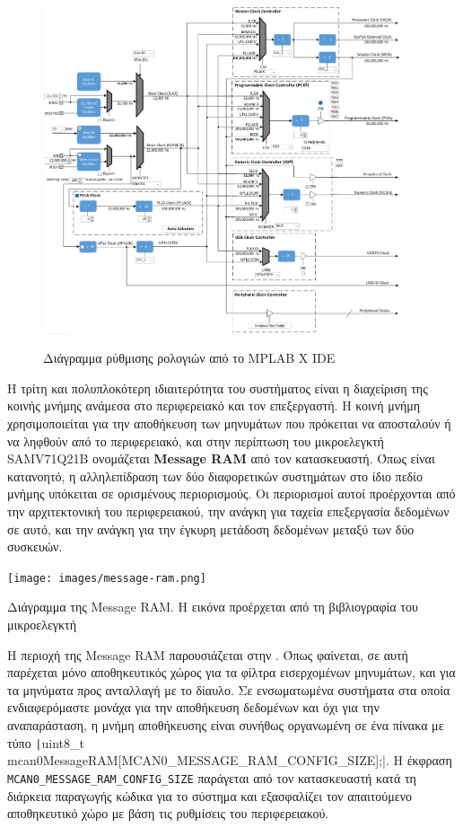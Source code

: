 \documentclass[a4paper,nobib,justified]{tufte-book}
\begin{document}
\begin{figure}
	\includegraphics[width=0.8\linewidth]{media/images/mplab-clock-diagram.png}
	\label{fig:mplab-clock}
	\caption{Διάγραμμα ρύθμισης ρολογιών από το MPLAB X IDE}
\end{figure}

Η τρίτη και πολυπλοκότερη ιδιαιτερότητα του συστήματος είναι η διαχείριση της κοινής μνήμης ανάμεσα στο περιφερειακό και τον επεξεργαστή. Η κοινή μνήμη χρησιμοποιείται για την αποθήκευση των μηνυμάτων που πρόκειται να αποσταλούν ή να ληφθούν από το περιφερειακό, και στην περίπτωση του μικροελεγκτή SAMV71Q21B ονομάζεται \textbf{Message RAM}  από τον κατασκευαστή. Όπως είναι κατανοητό, η αλληλεπίδραση των δύο διαφορετικών συστημάτων στο ίδιο πεδίο μνήμης υπόκειται σε ορισμένους περιορισμούς. Οι περιορισμοί αυτοί προέρχονται από την αρχιτεκτονική του περιφερειακού, την ανάγκη για ταχεία επεξεργασία δεδομένων σε αυτό, και την ανάγκη για την έγκυρη μετάδοση δεδομένων μεταξύ των δύο συσκευών.

\begin{marginfigure}
	\centering
	\texttt{[image: images/message-ram.png]}
	\label{fig:message-ram}
	\caption[Διάγραμμα της Message RAM]{Διάγραμμα της Message RAM. Η εικόνα προέρχεται από τη βιβλιογραφία του μικροελεγκτή}
\end{marginfigure}

Η περιοχή της Message RAM παρουσιάζεται στην . Όπως φαίνεται, σε αυτή παρέχεται μόνο αποθηκευτικός χώρος για τα φίλτρα εισερχομένων μηνυμάτων, και για τα μηνύματα προς ανταλλαγή με το δίαυλο. Σε ενσωματωμένα συστήματα στα οποία ενδιαφερόμαστε μονάχα για την αποθήκευση δεδομένων και όχι για την αναπαράσταση, η μνήμη αποθήκευσης είναι συνήθως οργανωμένη σε ένα πίνακα με τύπο \texttt|uint8_t mcan0MessageRAM[MCAN0_MESSAGE_RAM_CONFIG_SIZE];|. Η έκφραση \texttt{MCAN0\_MESSAGE\_RAM\_CONFIG\_SIZE} παράγεται από τον κατασκευαστή κατά τη διάρκεια παραγωγής κώδικα για το σύστημα και εξασφαλίζει τον απαιτούμενο αποθηκευτικό χώρο με βάση τις ρυθμίσεις του περιφερειακού.
\end{document}
